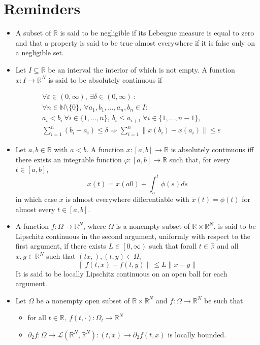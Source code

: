 \documentclass[12pt, openany]{report}
\theoremstyle{definition}
\newcommand{\R}{\mathbb{R}}
\begin{document}
\section{Reminders}
\begin{itemize}
    \item A subset of \(\R\) is said to be negligible if its Lebesgue measure is equal to zero and that a property is said to be true almost everywhere if it is false only on a negligible set. 
    \item Let \(I\subseteq \R\) be an interval the interior of which is not empty. A function \(x:I\rightarrow \R^N\) is said to be absolutely continuous if 
\end{itemize}
\begin{multline*}
        \forall \varepsilon \in (0,\infty),\: \exists \delta\in (0,\infty) \: : \\
        \forall n\in \mathbb{N}\setminus\{0\},\: \forall a_1,b_1,\dots, a_n,b_n\in I : \\ 
        a_i<b_i \: \forall i\in \{1,\dots,n\}, \: b_i\le a_{i+1} \:\forall i\in \{1,\dots,n-1\}, \\
        \sum_{i=1}^n(b_i-a_i)\le \delta \Longrightarrow \sum_{i=1}^n \lVert x(b_i)-x(a_i)\rVert \le \varepsilon
\end{multline*}
\begin{itemize}
    \item Let \(a,b\in \R\) with \(a<b\). A function \(x:[a,b]\rightarrow \R\) is absolutely continuous iff there exists an integrable function \(\varphi:[a,b]\rightarrow \R\) such that, for every \(t\in [a,b]\), \[x(t) = x(a0) + \int_a^t \phi(s)ds\] in which case \(x\) is almost everywhere differentiable with \(\dot x(t) = \phi(t)\) for almost every \(t\in [a,b]\). 
    \item A function \(f:\Omega\rightarrow \R^N\), where \(\Omega\) is a nonempty subset of \(\R\times \R^N\), is said to be Lipschitz continuous in the second argument, uniformly with respect to the first argument, if there exists \(L\in \left[0,\infty\right)\) such that forall \(t\in \R\) and all \(x,y\in \R^N\) such that \((tx,),(t,y)\in \Omega\), \[\lVert f(t,x)-f(t,y)\rVert \le L\lVert x-y\rVert\] It is said to be locally Lipschitz continuous on an open ball for each argument. 
    \item Let \(\Omega\) be a nonempty open subset of \(\R\times \R^N\) and \(f:\Omega\rightarrow \R^N\) be such that 
    \begin{itemize}
        \item for all \(t\in \R,\: f(t,\cdot):\Omega_t\rightarrow \R^N\)
        \item \(\partial_2f:\Omega \rightarrow \mathcal{L}(\R^N,\R^N):(t,x)\rightarrow \partial_2f(t,x)\) is locally bounded.
    \end{itemize}
\end{itemize}
\end{document}
